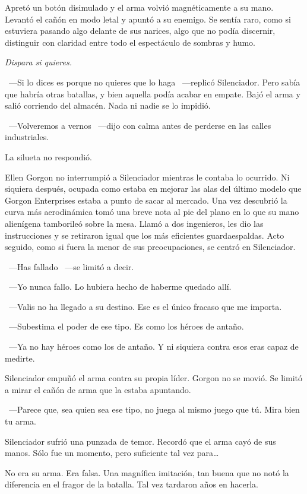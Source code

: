 Apretó un botón disimulado y el arma volvió magnéticamente a su mano. Levantó el cañón en modo letal y apuntó a su enemigo. Se sentía raro, como si estuviera pasando algo delante de sus narices, algo que no podía discernir, distinguir con claridad entre todo el espectáculo de sombras y humo.

\emph{Dispara si quieres.}

~---Si lo dices es porque no quieres que lo haga ~---replicó Silenciador. Pero sabía que habría otras batallas, y bien aquella podía acabar en empate. Bajó el arma y salió corriendo del almacén. Nada ni nadie se lo impidió.

~---Volveremos a vernos ~---dijo con calma antes de perderse en las calles industriales.

La silueta no respondió.

\bigskip\noindent
Ellen Gorgon no interrumpió a Silenciador mientras le contaba lo ocurrido. Ni siquiera después, ocupada como estaba en mejorar las alas del último modelo que Gorgon Enterprises estaba a punto de sacar al mercado. Una vez descubrió la curva más aerodinámica tomó una breve nota al pie del plano en lo que su mano alienígena tamborileó sobre la mesa. Llamó a dos ingenieros, les dio las instrucciones y se retiraron igual que los más eficientes guardaespaldas. Acto seguido, como si fuera la menor de sus preocupaciones, se centró en Silenciador.

~---Has fallado ~---se limitó a decir.

~---Yo nunca fallo. Lo hubiera hecho de haberme quedado allí.

~---Valis no ha llegado a su destino. Ese es el único fracaso que me importa.

~---Subestima el poder de ese tipo. Es como los héroes de antaño.

~---Ya no hay héroes como los de antaño. Y ni siquiera contra esos eras capaz de medirte.

Silenciador empuñó el arma contra su propia líder. Gorgon no se movió. Se limitó a mirar el cañón de arma que la estaba apuntando.

~---Parece que, sea quien sea ese tipo, no juega al mismo juego que tú. Mira bien tu arma.

Silenciador sufrió una punzada de temor. Recordó que el arma cayó de sus manos. Sólo fue un momento, pero suficiente tal vez para\dots

No era su arma. Era falsa. Una magnífica imitación, tan buena que no notó la diferencia en el fragor de la batalla. Tal vez tardaron años en hacerla.

